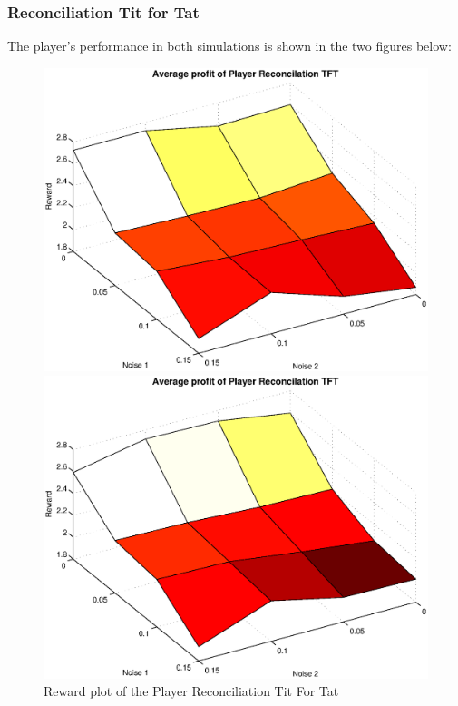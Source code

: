 \documentclass[11pt,twoside]{article}
\begin{document}
\subsubsection{Reconciliation Tit for Tat}
The player's performance in both simulations is shown in the two figures below:
\begin{figure}[h]

\begin{minipage}[hbt]{0.65\textwidth}
	\centering
	\includegraphics[width=\textwidth]{pics/simulation1/Reward_vs_Noise_of_Player_Reconcilation_TFT}
\end{minipage}
\hfill
\begin{minipage}[hbt]{0.3\textwidth}
	\centering
	\includegraphics[width=\textwidth]{pics/simulation2/Reward_vs_Noise_of_Player_Reconcilation_TFT}
\end{minipage}
	\caption{Reward plot of the Player Reconciliation Tit For Tat}
	\label{pic player rtft}
\end{figure}
\end{document}
